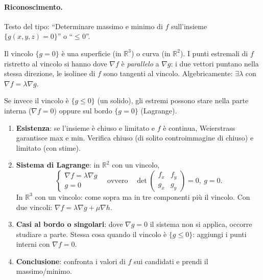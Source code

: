 \documentclass[11pt,a4paper,openany]{book}
\theoremstyle{plain}
\theoremstyle{definition}
\theoremstyle{remark}
\newcommand{\R}{\mathbb{R}}
\begin{document}
\paragraph{Riconoscimento.} Testo del tipo:
``Determinare massimo e minimo di $f$ sull'insieme
$\{g(x,y,z)=0\}$'' o ``$\le 0$''.

\begin{nota}[title={Intuizione}]
Il vincolo $\{g=0\}$ \`e una superficie (in $\R^3$) o curva (in $\R^2$).
I punti estremali di $f$ ristretto al vincolo si hanno dove
$\nabla f$ \`e \emph{parallelo} a $\nabla g$: i due vettori puntano
nella stessa direzione, le isolinee di $f$ sono tangenti al vincolo.
Algebricamente: $\exists\lambda$ con $\nabla f=\lambda\nabla g$.

Se invece il vincolo \`e $\{g\le 0\}$ (un solido), gli estremi possono
stare nella parte interna ($\nabla f=0$) oppure sul bordo $\{g=0\}$
(Lagrange).
\end{nota}

\begin{ricetta}[title={Lagrange su un vincolo}]
\begin{enumerate}
\item \textbf{Esistenza}: se l'insieme \`e chiuso e limitato e $f$ \`e
   continua, Weierstrass garantisce max e min. Verifica chiuso (di
   solito controimmagine di chiuso) e limitato (con stime).
\item \textbf{Sistema di Lagrange}: in $\R^2$ con un vincolo,
   \[
   \begin{cases}\nabla f=\lambda\nabla g\\ g=0\end{cases}
   \quad\text{ovvero}\quad
   \det\begin{pmatrix}f_x&f_y\\g_x&g_y\end{pmatrix}=0,\ g=0.
   \]
   In $\R^3$ con un vincolo: come sopra ma in tre componenti pi\`u il
   vincolo. Con due vincoli: $\nabla f=\lambda\nabla g+\mu\nabla h$.
\item \textbf{Casi al bordo o singolari}: dove $\nabla g=0$ il sistema
   non si applica, occorre studiare a parte. Stessa cosa quando il
   vincolo \`e $\{g\le 0\}$: aggiungi i punti interni con $\nabla f=0$.
\item \textbf{Conclusione}: confronta i valori di $f$ sui candidati e
   prendi il massimo/minimo.
\end{enumerate}
\end{ricetta}
\end{document}

